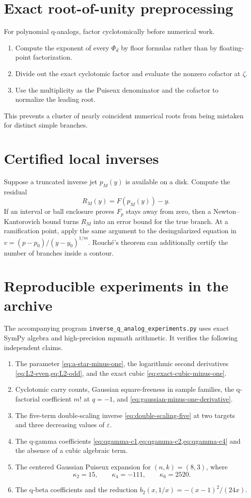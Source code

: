 \documentclass[11pt,letterpaper,oneside,openany]{book}
\theoremstyle{definition}
\theoremstyle{remark}
\begin{document}
\section{Exact root-of-unity preprocessing}
For polynomial q-analogs, factor cyclotomically before numerical work.
\begin{enumerate}
\item Compute the exponent of every \(\Phi_d\) by floor formulas rather than by
floating-point factorization.
\item Divide out the exact cyclotomic factor and evaluate the nonzero cofactor
at \(\zeta\).
\item Use the multiplicity as the Puiseux denominator and the cofactor to
normalize the leading root.
\end{enumerate}
This prevents a cluster of nearly coincident numerical roots from being
mistaken for distinct simple branches.

\section{Certified local inverses}
Suppose a truncated inverse jet \(p_M(y)\) is available on a disk.  Compute the
residual
\[
 R_M(y)=F(p_M(y))-y.
\]
If an interval or ball enclosure proves \(F_p\) stays away from zero, then a
Newton--Kantorovich bound turns \(R_M\) into an error bound for the true branch.
At a ramification point, apply the same argument to the desingularized equation
in \(v=(p-p_0)/(y-y_0)^{1/m}\).  Rouch\'e's theorem can additionally certify
the number of branches inside a contour.

\section{Reproducible experiments in the archive}
The accompanying program
\texttt{inverse\_q\_analog\_experiments.py} uses exact SymPy algebra and
high-precision mpmath arithmetic.  It verifies the following independent
claims.
\begin{enumerate}
\item The parameter \cref{eq:a-star-minus-one}, the logarithmic second
derivatives \cref{eq:L2-even,eq:L2-odd}, and the exact cubic
\cref{eq:exact-cubic-minus-one}.
\item Cyclotomic carry counts, Gaussian square-freeness in sample families,
the q-factorial coefficient \(m!\) at \(q=-1\), and
\cref{eq:gaussian-minus-one-derivative}.
\item The five-term double-scaling inverse \cref{eq:double-scaling-five} at two
targets and three decreasing values of \(\varepsilon\).
\item The q-gamma coefficients \cref{eq:qgamma-c1,eq:qgamma-c2,eq:qgamma-c4}
and the absence of a cubic algebraic term.
\item The centered Gaussian Puiseux expansion for \((n,k)=(8,3)\), where
\[
 \kappa_2=15,
 \qquad \kappa_4=-111,
 \qquad \kappa_6=2520.
\]
\item The q-beta coefficients and the reduction
\(b_2(x,1/x)=-(x-1)^2/(24x)\).
\end{enumerate}
\end{document}
